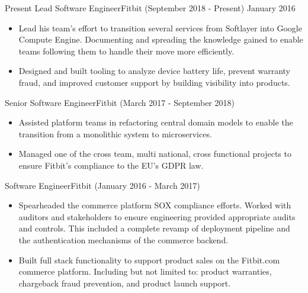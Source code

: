 %
%
%
\begin{experiences}
  \experience
  {Present}  {Lead Software Engineer}{Fitbit {\footnotesize (September 2018 - Present)}}
  {January 2016}   {
                      \begin{itemize}
                        \item Lead his team’s effort to transition several services from Softlayer into Google Compute Engine. Documenting and spreading the knowledge gained to enable teams following them to handle their move more efficiently.
                        \item Designed and built tooling to analyze device battery life, prevent warranty fraud, and improved customer support by building visibility into products.
                      \end{itemize}
                  }
                  {}
  \experience
  {}  {Senior Software Engineer}{Fitbit {\footnotesize (March 2017 - September 2018)}}
  {}   {
                      \begin{itemize}
                        \item Assisted platform teams in refactoring central domain models to enable the transition from a monolithic system to microservices.
                        \item Managed one of the cross team, multi national, cross functional projects to ensure Fitbit’s compliance to the EU’s GDPR law.
                      \end{itemize}
                  }
                  {}
   \experience
  {}  {Software Engineer}{Fitbit {\footnotesize (January 2016 - March 2017)}}
  {}   {
                      \begin{itemize}
                        \item Spearheaded the commerce platform SOX compliance efforts. Worked with auditors and stakeholders to ensure engineering provided appropriate audits and controls. This included a complete revamp of deployment pipeline and the authentication mechanisms of the commerce backend.
                        \item Built full stack functionality to support product sales on the Fitbit.com commerce platform. Including but not limited to: product warranties, chargeback fraud prevention, and product launch support.

\end{itemize}}
\end{experiences}
